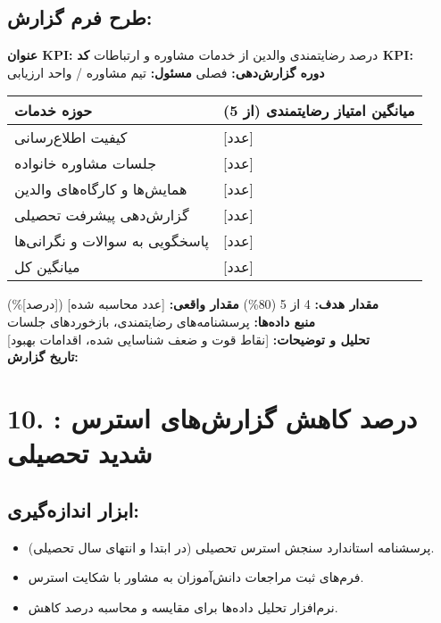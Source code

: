 \documentclass[11pt]{article}
\begin{document}
\subsection*{طرح فرم گزارش:}
\noindent\textbf{عنوان KPI:} درصد رضایتمندی والدین از خدمات مشاوره و ارتباطات \hfill \textbf{کد KPI:}  \\
\noindent\textbf{دوره گزارش‌دهی:} فصلی \hfill \textbf{مسئول:} تیم مشاوره / واحد ارزیابی \\

\bigskip
\begin{tabular}{ll}
\textbf{حوزه خدمات} & \textbf{میانگین امتیاز رضایتمندی (از 5)} \\
\hline
کیفیت اطلاع‌رسانی & {[عدد]} \\
جلسات مشاوره خانواده & {[عدد]} \\
همایش‌ها و کارگاه‌های والدین & {[عدد]} \\
گزارش‌دهی پیشرفت تحصیلی & {[عدد]} \\
پاسخگویی به سوالات و نگرانی‌ها & {[عدد]} \\
میانگین کل & {[عدد]} \\
\end{tabular}
\bigskip

\noindent\textbf{مقدار هدف:} 4 از 5 (80\%) \hfill \textbf{مقدار واقعی:} {[عدد محاسبه شده]} ({[درصد]\%}) \\
\noindent\textbf{منبع داده‌ها:} پرسشنامه‌های رضایتمندی، بازخوردهای جلسات \\
\noindent\textbf{تحلیل و توضیحات:} {[نقاط قوت و ضعف شناسایی شده، اقدامات بهبود]} \\
\noindent\textbf{تاریخ گزارش:} \\

\hrulefill
\bigskip

\section*{10. : درصد کاهش گزارش‌های استرس شدید تحصیلی}

\subsection*{ابزار اندازه‌گیری:}
\begin{itemize}
    \item پرسشنامه استاندارد سنجش استرس تحصیلی (در ابتدا و انتهای سال تحصیلی).
    \item فرم‌های ثبت مراجعات دانش‌آموزان به مشاور با شکایت استرس.
    \item نرم‌افزار تحلیل داده‌ها برای مقایسه و محاسبه درصد کاهش.
\end{itemize}
\end{document}

